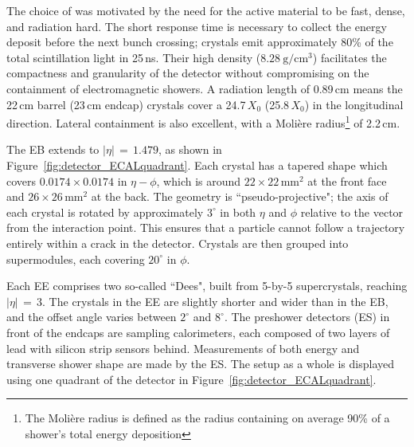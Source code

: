 The choice of \pbw was motivated by the need for the active material to be fast, dense, and radiation hard.
The short response time is necessary to collect the energy deposit before the next bunch crossing; 
\pbw crystals emit approximately 80\% of the total scintillation light in 25\,ns.
Their high density ($\SI{8.28}{\gram\per\centi\metre^3}$) facilitates the compactness and granularity of the detector without compromising on the containment of electromagnetic showers.
A radiation length of 0.89\,cm means the 22\,cm barrel (23\,cm endcap) crystals cover a 24.7\,$X_0$ (25.8\,$X_0$) in the longitudinal direction. %
Lateral containment is also excellent, with a Moli\`ere radius\footnote{The Moli\`ere radius 
is defined as the radius containing on average 90\% of a shower's total energy deposition}
of 2.2\,cm. %

The EB extends to $|\eta|\,=\,1.479$, as shown in Figure~\ref{fig:detector_ECALquadrant}.
Each crystal has a tapered shape which covers $0.0174\times0.0174$ in $\eta-\phi$, 
which is around $22\times22\,\textrm{mm}^2$ at the front face and $26\times26\,\textrm{mm}^2$ at the back.
The geometry is ``pseudo-projective"; the axis of each crystal is rotated by approximately $3^{\circ}$ in both $\eta$ and $\phi$ relative to the vector from the interaction point.
This ensures that a particle cannot follow a trajectory entirely within a crack in the detector.
Crystals are then grouped into supermodules, each covering $20^{\circ}$ in $\phi$.

Each EE comprises two so-called ``Dees", built from 5-by-5 supercrystals, reaching $|\eta|\,=\,3$.
The crystals in the EE are slightly shorter and wider than in the EB, 
and the offset angle varies between $2^{\circ}$ and $8^{\circ}$.
The preshower detectors (ES) in front of the endcaps are sampling calorimeters, 
each composed of two layers of lead with silicon strip sensors behind. %
Measurements of both energy and transverse shower shape are made by the ES.
The setup as a whole is displayed using one quadrant of the detector in Figure~\ref{fig:detector_ECALquadrant}.

